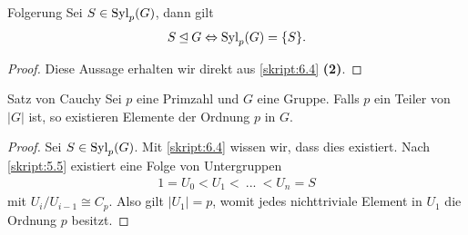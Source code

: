 \begin{genericthm}{Folgerung} \label{skript:6.5}
	Sei $ S \in \operatorname{Syl}_p(G) $, dann gilt
	\begin{align*}
	S \unlhd G \Leftrightarrow \operatorname{Syl}_p(G) = \lbrace S \rbrace.
	\end{align*}
\end{genericthm}

\begin{proof}
	Diese Aussage erhalten wir direkt aus \ref{skript:6.4} \textbf{(2)}.
\end{proof}

\begin{genericthm}{Satz von Cauchy} \label{skript:6.6} 
	Sei $ p  $ eine Primzahl und $ G $ eine Gruppe.
	Falls $ p $ ein Teiler von $ |G| $ ist, so existieren Elemente der Ordnung $ p $ in $ G $.
\end{genericthm}

\begin{proof}
	Sei $ S \in \operatorname{Syl}_p(G) $. Mit \ref{skript:6.4} wissen wir, dass dies existiert.
	Nach \ref{skript:5.5} existiert eine Folge von Untergruppen 
	\begin{align*}
	1 = U_0 < U_1 < \ ... \ < U_n = S
	\end{align*}
	mit $ U_i / U_{i-1} \cong C_p $.
	Also gilt $ |U_1| = p $, womit jedes nichttriviale Element in $ U_1 $ die Ordnung $ p $ besitzt. 
\end{proof}

